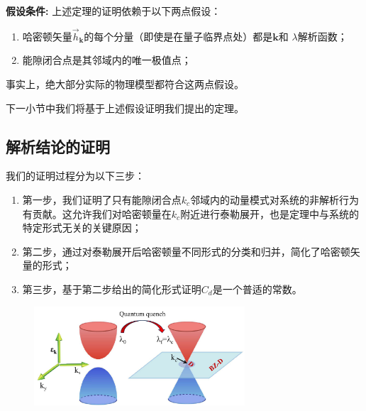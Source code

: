 			{\bf 假设条件:}
			上述定理的证明依赖于以下两点假设：
			\begin{enumerate}
				\item 哈密顿矢量${\vec{h}}_{\mathbf{k}}$的每个分量（即使是在量子临界点处）都是$\mathbf{k}$和 $\lambda$解析函数；
				\item 能隙闭合点是其邻域内的唯一极值点；
			\end{enumerate}
			事实上，绝大部分实际的物理模型都符合这两点假设。
			
			下一小节中我们将基于上述假设证明我们提出的定理。
			
		\subsection{解析结论的证明}
		
			我们的证明过程分为以下三步：
			\begin{enumerate}
				\item 第一步，我们证明了只有能隙闭合点$k_c$邻域内的动量模式对系统的非解析行为有贡献。这允许我们对哈密顿量在$k_c$附近进行泰勒展开，也是定理中与系统的特定形式无关的关键原因；
				\item 第二步，通过对泰勒展开后哈密顿量不同形式的分类和归并，简化了哈密顿矢量的形式；
				\item 第三步，基于第二步给出的简化形式证明$C_d$是一个普适的常数。
			\end{enumerate}
		
			\begin{figure}[!htp]
				\centering
				\includegraphics[width=0.7\textwidth]{figures/QV_BZ_D.pdf}
				\centering
				 \label{Fig:BZ_D}
			\end{figure} 
		
		
